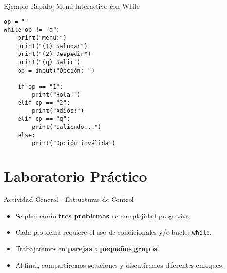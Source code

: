 \documentclass[10pt]{beamer}
\begin{document}
\begin{frame}[fragile]{Ejemplo Rápido: Menú Interactivo con While}
\begin{verbatim}
op = ""
while op != "q":
    print("Menú:")
    print("(1) Saludar")
    print("(2) Despedir")
    print("(q) Salir")
    op = input("Opción: ")

    if op == "1":
        print("Hola!")
    elif op == "2":
        print("Adiós!")
    elif op == "q":
        print("Saliendo...")
    else:
        print("Opción inválida")
\end{verbatim}
\end{frame}

\section{Laboratorio Práctico}

\begin{frame}{Actividad General - Estructuras de Control}
  \begin{itemize}
    \item Se plantearán \textbf{tres problemas} de complejidad progresiva.
    \item Cada problema requiere el uso de condicionales y/o bucles \texttt{while}.
    \item Trabajaremos en \textbf{parejas} o \textbf{pequeños grupos}.
    \item Al final, compartiremos soluciones y discutiremos diferentes enfoques.
  \end{itemize}
\end{frame}
\end{document}
